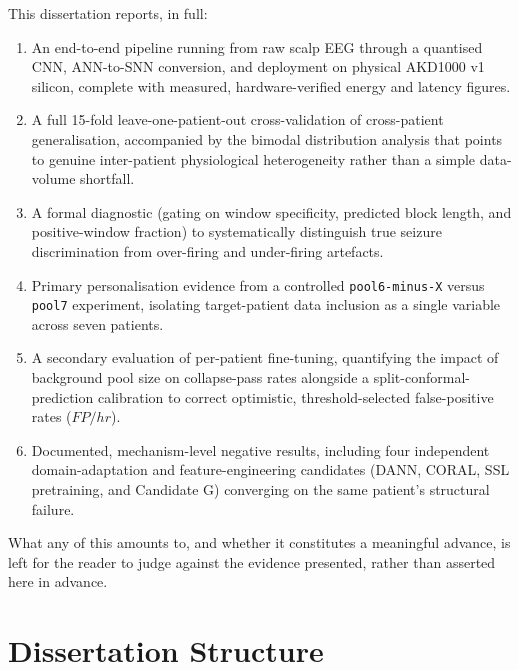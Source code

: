 This dissertation reports, in full:
\begin{enumerate}
    \item An end-to-end pipeline running from raw scalp EEG through a quantised CNN, ANN-to-SNN conversion, and deployment on physical AKD1000 v1 silicon, complete with measured, 
    hardware-verified energy and latency figures.
    \item A full 15-fold leave-one-patient-out cross-validation of cross-patient generalisation, accompanied by the bimodal distribution analysis that points to genuine inter-patient 
    physiological heterogeneity rather than a simple data-volume shortfall.
    \item A formal diagnostic (gating on window specificity, predicted block length, and positive-window fraction) to systematically distinguish true seizure discrimination 
    from over-firing and under-firing artefacts.
    \item Primary personalisation evidence from a controlled \texttt{pool6-minus-X} versus \texttt{pool7} experiment, isolating target-patient data inclusion as a single variable 
    across seven patients.
    \item A secondary evaluation of per-patient fine-tuning, quantifying the impact of background pool size on collapse-pass rates alongside a split-conformal-prediction calibration 
    to correct optimistic, threshold-selected false-positive rates ($FP/hr$).
    \item Documented, mechanism-level negative results, including four independent domain-adaptation and feature-engineering candidates (DANN, CORAL, SSL pretraining, and Candidate G) 
    converging on the same patient's structural failure.
\end{enumerate}

What any of this amounts to, and whether it constitutes a meaningful advance, is left for the reader to judge against the evidence presented, rather than asserted here in advance.
\section{Dissertation Structure}

